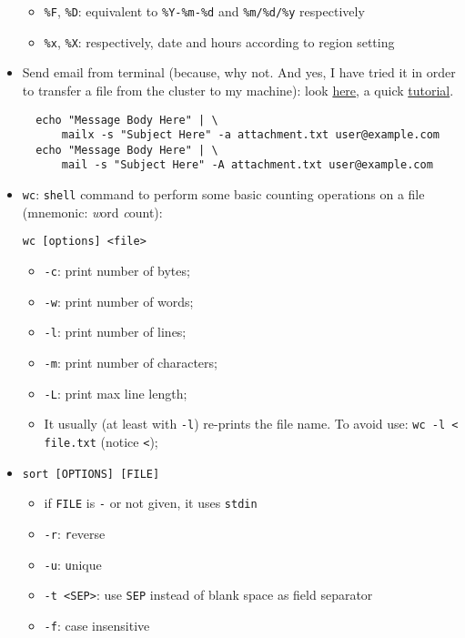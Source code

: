 \documentclass[a4paper,12pt,%
              final%
              ]{article}
\begin{document}
\begin{itemize}
\begin{itemize}
      \item \verb|%F|, \verb|%D|: equivalent to \verb|%Y-%m-%d| and \verb|%m/%d/%y| respectively
      \item \verb|%x|, \verb|%X|: respectively, date and hours according to region setting
    \end{itemize}
  \item Send email from terminal (because, why not. And yes, I have tried it in order to transfer a file from the cluster to my machine): look \href{https://www.tecmint.com/send-email-attachment-from-linux-commandline/}{here}, a quick \href{https://www.interserver.net/tips/kb/linux-mail-command-usage-examples/}{tutorial}.
\begin{verbatim}
  echo "Message Body Here" | \
      mailx -s "Subject Here" -a attachment.txt user@example.com
  echo "Message Body Here" | \
      mail -s "Subject Here" -A attachment.txt user@example.com
\end{verbatim}
  \item \texttt{wc}: \texttt{shell} command to perform some basic counting operations on a file (mnemonic: \emph{w}ord \emph{c}ount):
\begin{verbatim}
wc [options] <file>
\end{verbatim}
    \begin{itemize}
      \item \verb|-c|: print number of bytes;
      \item \verb|-w|: print number of words;
      \item \verb|-l|: print number of lines;
      \item \verb|-m|: print number of characters;
      \item \verb|-L|: print max line length;
      \item It usually (at least with \verb|-l|) re-prints the file name. To avoid use: \verb|wc -l < file.txt| (notice \verb|<|);
    \end{itemize}
  \item \texttt{sort [OPTIONS] [FILE]}
    \begin{itemize}
      \item if \texttt{FILE} is \texttt{-} or not given, it uses \texttt{stdin}
      \item \verb|-r|: \texttt{r}everse
      \item \verb|-u|: \texttt{u}nique
      \item \verb|-t <SEP>|: use \texttt{SEP} instead of blank space as field separator
      \item \verb|-f|: case insensitive

\end{itemize}
\end{itemize}
\end{document}
